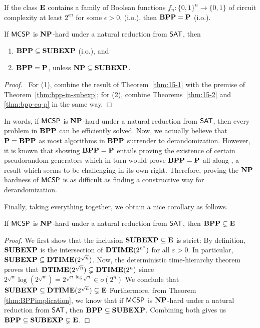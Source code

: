 \documentclass[11pt]{article}
\begin{document}
\begin{theorem}
  \label{thm:bpp-eq-p}
	If the class $\mathbf{E}$ contains a family of Boolean functions $f_n: \{0, 1\}^n \rightarrow \{0, 1\}$ of circuit complexity at least $2^{\epsilon n}$ for some $\epsilon > 0$, (i.o.), then $\mathbf{BPP} = \mathbf{P}$ (i.o.).
\end{theorem}

\begin{theorem}[\cite{10.1145/335305.335314}]
	\label{thm:BPPimplication}
	If $\mathsf{MCSP}$ is $\mathbf{NP}$-hard under a natural reduction from $\mathsf{SAT}$, then
	\begin{enumerate} [1.]
		\item $\mathbf{BPP} \subseteq \mathbf{SUBEXP}$ (i.o.), and
		\item $\mathbf{BPP} = \mathbf{P}$, unless $\mathbf{NP} \subseteq \mathbf{SUBEXP}$.
	\end{enumerate}
\end{theorem}

\begin{proof} \
  For (1), combine the result of Theorem~\ref{thm:15-1} with the premise of
  Theorem~\ref{thm:bpp-in-subexp};
  for (2), combine Theorems~\ref{thm:15-2} and \ref{thm:bpp-eq-p} in the same
  way.
\end{proof}

In words, if $\mathsf{MCSP}$ is $\mathbf{NP}$-hard under a natural reduction from
$\mathsf{SAT}$, then every problem in $\mathbf{BPP}$ can be efficiently solved.
Now, we actually believe that $\mathbf{P} = \mathbf{BPP}$ as most algorithms in $\mathbf{BPP}$ surrender
to derandomization.
However, it is known that showing $\mathbf{BPP} = \mathbf{P}$ entails proving the existence
of certain pseudorandom generators which in turn would prove $\mathbf{BPP} = \mathbf{P}$ all
along \cite{goldreich11},
a result which seems to be challenging in its own right.
Therefore, proving the $\mathbf{NP}$-hardness of $\mathsf{MCSP}$ is as difficult
as finding a constructive way for derandomization.

Finally, taking everything together, we obtain a nice corollary as follows.

\begin{corollary}
	If $\mathsf{MCSP}$ is $\mathbf{NP}$-hard under a natural reduction from $\mathsf{SAT}$, then $\mathbf{BPP} \subsetneq \mathbf{E}$
\end{corollary}

\begin{proof}
  We first show that the inclusion $\mathbf{SUBEXP} \subseteq \mathbf{E}$ is
  strict:
  By definition, $\mathbf{SUBEXP}$ is the intersection of
  $\mathbf{DTIME}(2^{n^\varepsilon})$ for all $\varepsilon > 0$.
  In particular, $\mathbf{SUBEXP} \subseteq \mathbf{DTIME}(2^{\sqrt n})$.
  Now, the deterministic time-hierarchy theorem proves that
  $\mathbf{DTIME}(2^{\sqrt n}) \subsetneq \mathbf{DTIME}(2^{n})$ since
  $2^{\sqrt n} \log(2^{\sqrt n}) = 2^{\sqrt n \log \sqrt n}
   \in o(2^n)$
  We conclude that
  $\mathbf{SUBEXP} \subseteq \mathbf{DTIME}(2^{\sqrt n}) \subsetneq \mathbf{E}$
  Furthermore, from Theorem \ref{thm:BPPimplication}, we know that if
  $\mathsf{MCSP}$ is
  $\mathbf{NP}$-hard under a natural reduction from $\mathsf{SAT}$, then
  $\mathbf{BPP} \subseteq \mathbf{SUBEXP}$.
  Combining both gives us
  $\mathbf{BPP} \subseteq \mathbf{SUBEXP} \subsetneq \mathbf{E}$.
\end{proof}
\end{document}
